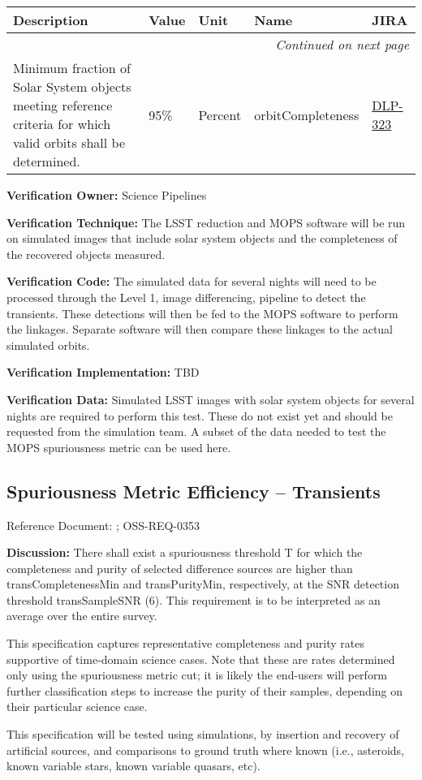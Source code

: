 \documentclass[DM,lsstdraft,toc]{lsstdoc}
\makeatletter
\newcommand{\jira}[1]{\href{https://jira.lsstcorp.org/browse/#1}{#1}}
\newenvironment{metric}[0]{%
\setlength\LTleft{0pt}
\setlength\LTright{\fill}
\begin{longtable}[]{@{}p{0.4\textwidth}lp{0.75in}p{1.3in}p{0.75in}@{}}

\hline \textbf{Description} & \textbf{Value} & \textbf{Unit} & \textbf{Name} & \textbf{JIRA} \\ \hline
\endhead

\hline \multicolumn{5}{r}{\emph{Continued on next page}} \\
\endfoot

\hline\hline
\endlastfoot
}{%
\hline
\end{longtable}
}
\makeatother
\begin{document}
\begin{metric}
Minimum fraction of Solar System objects meeting reference criteria for
which valid orbits shall be determined. & 95\% & Percent &
orbitCompleteness & \jira{DLP-323}\tabularnewline
\end{metric}

\textbf{Verification Owner:} Science Pipelines

\textbf{Verification Technique:} The LSST reduction and MOPS software
will be run on simulated images that include solar system objects and
the completeness of the recovered objects measured.

\textbf{Verification Code:} The simulated data for several nights will
need to be processed through the Level 1, image differencing, pipeline
to detect the transients. These detections will then be fed to the MOPS
software to perform the linkages. Separate software will then compare
these linkages to the actual simulated orbits.

\textbf{Verification Implementation:} TBD

\textbf{Verification Data:} Simulated LSST images with solar system
objects for several nights are required to perform this test. These do
not exist yet and should be requested from the simulation team. A subset
of the data needed to test the MOPS spuriousness metric can be used
here.

\subsection{Spuriousness Metric Efficiency --
Transients}\label{spuriousness-metric-efficiency-transients}

Reference Document: ; OSS-REQ-0353

\textbf{Discussion:} There shall exist a spuriousness threshold T for
which the completeness and purity of selected difference sources are
higher than transCompletenessMin and transPurityMin, respectively, at
the SNR detection threshold transSampleSNR (6). This requirement is to
be interpreted as an average over the entire survey.

This specification captures representative completeness and purity rates
supportive of time-domain science cases. Note that these are rates
determined only using the spuriousness metric cut; it is likely the
end-users will perform further classification steps to increase the
purity of their samples, depending on their particular science case.

This specification will be tested using simulations, by insertion and
recovery of artificial sources, and comparisons to ground truth where
known (i.e., asteroids, known variable stars, known variable quasars,
etc).
\end{document}
